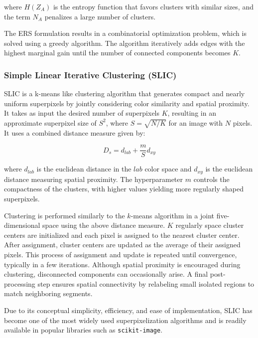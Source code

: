 \documentclass[twoside,english]{article}
\begin{document}
where \( H(Z_A) \) is the entropy function that favors clusters with similar sizes, and the term \( N_A \) penalizes a large number of clusters.

The ERS formulation results in a combinatorial optimization problem, which is solved using a greedy algorithm. The algorithm iteratively adds edges with the highest marginal gain until the number of connected components becomes \( K \). 

\subsubsection{Simple Linear Iterative Clustering (SLIC)}\label{sec:slic}

SLIC is a k-means like clustering algorithm that generates compact and nearly uniform superpixels by jointly considering color similarity and spatial proximity. It takes as input the desired number of superpixels \( K \), resulting in an approximate superpixel size of \( S^2 \), where \( S = \sqrt{N/K} \) for an image with \( N \) pixels. It uses a combined distance measure given by: 

\begin{equation}
	D_s = d_{lab} + \frac{m}{S}d_{xy}
\end{equation}

where \( d_{lab}\) is the euclidean distance in the \(lab\) color space and \(d_{xy}\) is the euclidean distance measuring spatial proximity. The hyperparameter \(m\) controls the compactness of the clusters, with higher values yielding more regularly shaped superpixels.

Clustering is performed similarly to the \(k\)-means algorithm in a joint five-dimensional space using the above distance measure. \( K \) regularly space cluster centers are initialized and each pixel is assigned to the nearest cluster center. After assignment, cluster centers are updated as the average of their assigned pixels. This process of assignment and update is repeated until convergence, typically in a few iterations. Although spatial proximity is encouraged during clustering, disconnected components can occasionally arise. A final post-processing step ensures spatial connectivity by relabeling small isolated regions to match neighboring segments.

Due to its conceptual simplicity, efficiency, and ease of implementation, SLIC has become one of the most widely used superpixelization algorithms and is readily available in popular libraries such as \texttt{scikit-image}.
\end{document}
